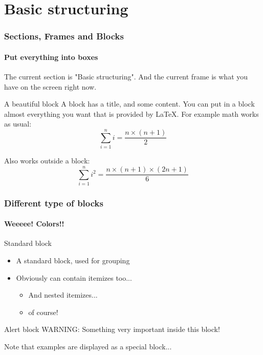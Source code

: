 \documentclass[
blue,
notes %
]{mozilla}
\begin{document}
\section{Basic structuring}
\begin{frame}
  \frametitle{Sections, Frames and Blocks}
  \framesubtitle{Put everything into boxes}

  The current section is "Basic structuring". And the current frame
  is what you have on the screen right now.

  \begin{block}{A beautiful block}
  A block has a title, and some content. You can put in a block
  almost everything you want that is provided by LaTeX. For example
  math works as usual:
    \begin{equation}
    \sum_{i=1}^n i = \frac{n \times (n+1)}{2}
    \end{equation}
  \end{block}

  Also works outside a block:
  \begin{equation}
  \sum_{i=1}^n i^2 = \frac{n \times (n+1) \times (2n+1)}{6}
  \end{equation}
\end{frame}

\begin{frame}
  \frametitle{Different type of blocks}
  \framesubtitle{Weeeee! Colors!!}
  \begin{block}{Standard block}
  \begin{itemize}
    \item A standard block, used for grouping
    \item Obviously can contain itemizes too...
    \begin{itemize}
      \item And nested itemizes...
      \item of course!
    \end{itemize}
  \end{itemize}
  \end{block}
  \begin{alertblock}{Alert block}
  WARNING: Something very important inside this block!
  \end{alertblock}
  \begin{example}
  Note that examples are displayed as a special block...
  \end{example}
\end{frame}
\end{document}
